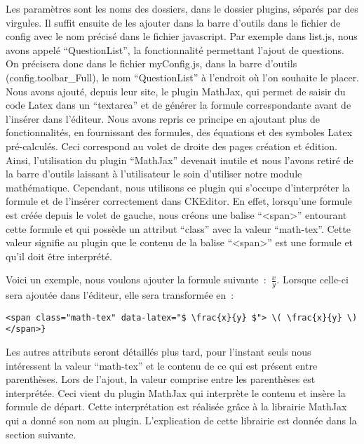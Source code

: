 Les paramètres sont les noms des dossiers, dans le dossier plugins, séparés par des virgules. Il suffit ensuite de les ajouter dans la barre d'outils dans le fichier de config avec le nom précisé dans le fichier javascript. Par exemple dans list.js, nous avons appelé \enquote{QuestionList}, la fonctionnalité permettant l'ajout de questions. On précisera donc dans le fichier myConfig.js, dans la barre d'outils (config.toolbar\_Full), le nom \enquote{QuestionList} à l'endroit où l'on souhaite le placer. \\ 

Nous avons ajouté, depuis leur site, le plugin MathJax, qui permet de saisir du code Latex dans un \enquote{textarea} et de générer la formule correspondante avant de l'insérer dans l'éditeur. Nous avons repris ce principe en ajoutant plus de fonctionnalités, en fournissant des formules, des équations et des symboles Latex pré-calculés. Ceci correspond au volet de droite des pages création et édition. Ainsi, l'utilisation du plugin \enquote{MathJax} devenait inutile et nous l'avons retiré de la barre d'outils laissant à l'utilisateur le soin d'utiliser notre module mathématique. Cependant, nous utilisons ce plugin qui s'occupe d'interpréter la formule et de l'insérer correctement dans CKEditor. En effet, lorsqu'une formule est créée depuis le volet de gauche, nous créons une balise \enquote{<span>} entourant cette formule et qui possède un attribut \enquote{class} avec la valeur \enquote{math-tex}. Cette valeur signifie au plugin que le contenu de la balise \enquote{<span>} est une formule et qu'il doit être interprété. 

Voici un exemple, nous voulons ajouter la formule suivante~:~$\frac{x}{y}$. Lorsque celle-ci sera ajoutée dans l'éditeur, elle sera transformée en~:
\begin{Verbatim}[frame=single,fontsize=\scriptsize]
<span class="math-tex" data-latex="$ \frac{x}{y} $"> \( \frac{x}{y} \) </span>}
\end{Verbatim}

Les autres attributs seront détaillés plus tard, pour l'instant seuls nous intéressent la valeur \enquote{math-tex} et le contenu de ce qui est présent entre parenthèses. Lors de l'ajout, la valeur comprise entre les parenthèses est interprétée. Ceci vient du plugin MathJax qui interprète le contenu et insère la formule de départ. Cette interprétation est réalisée grâce à la librairie MathJax qui a donné son nom au plugin. L'explication de cette librairie est donnée dans la section suivante.\\

